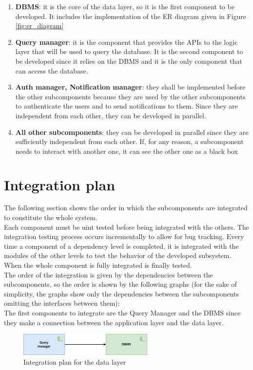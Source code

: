 \begin{enumerate}
    \item \textbf{DBMS}: it is the core of the data layer, so it is the first component to be developed. It includes the implementation of the ER diagram given in Figure \ref{fig:er_diagram}
    \item \textbf{Query manager}: it is the component that provides the APIs to the logic layer that will be used to query the database. It is the second component to be developed since it relies on the DBMS and it is the only component that can access the database.
    \item \textbf{Auth manager, Notification manager}: they shall be implemented before the other subcomponents because they are used by the other subcomponents to authenticate the users and to send notifications to them. Since they are independent from each other, they can be developed in parallel.
    \item \textbf{All other subcomponents}: they can be developed in parallel since they are sufficiently independent from each other. If, for any reason, a subcomponent needs to interact with another one, it can see the other one as a black box
\end{enumerate}

\section{Integration plan}
The following section shows the order in which the subcomponents are integrated to constitute the whole system. \\
Each component must be uint tested before being integrated with the others.
The integration testing process occurs incrementally to allow for bug tracking. 
Every time a component of a dependency level is completed, it is integrated with the modules of the other levels to test the behavior of the developed subsystem. 
When the whole component is fully integrated is finally tested.\\
The order of the integration is given by the dependencies between the subcomponents, so the order is shown by the following graphs (for the sake of simplicity, the graphs show only the dependencies between the subcomponents omitting the interfaces between them):\\

The first components to integrate are the Query Manager and the DBMS since they make a connection between the application layer and the data layer. \\
\begin{figure}[H]
    \centering
    \includegraphics[width=0.6\textwidth]{images/test_plan/test-plan-1.png}
    \caption{Integration plan for the data layer}
    \label{fig:test-plan-1}
\end{figure}

